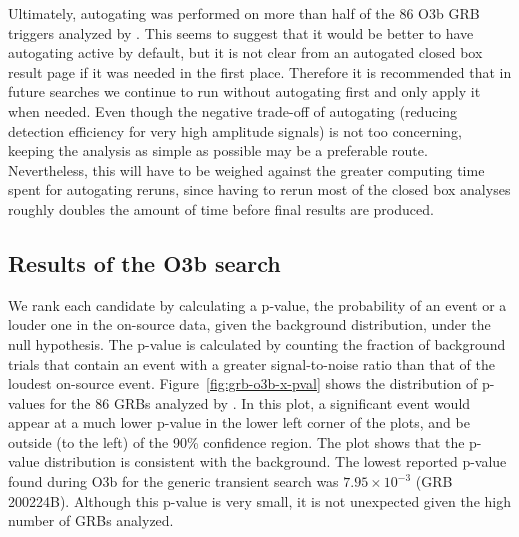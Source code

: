 

Ultimately, autogating was performed on more than half of the 86 O3b GRB triggers analyzed by \xpip.
This seems to suggest that it would be better to have autogating active by default, but it is not clear from an autogated closed box result page if it was needed in the first place.
Therefore it is recommended that in future searches we continue to run \xpip without autogating first and only apply it when needed.
Even though the negative trade-off of autogating (reducing detection efficiency for very high amplitude signals) is not too concerning, keeping the analysis as simple as possible may be a preferable route.
Nevertheless, this will have to be weighed against the greater computing time spent for autogating reruns, since having to rerun most of the closed box analyses roughly doubles the amount of time before final results are produced.


\subsection{Results of the O3b search}\label{sec:grb-o3b-results}

We rank each candidate by calculating a p-value, the probability of an event or a louder one in the on-source data, given the background distribution, under the null hypothesis.
The p-value is calculated by counting the fraction of background trials that contain an event with a greater signal-to-noise ratio than that of the loudest on-source event.
Figure~\ref{fig:grb-o3b-x-pval} shows the distribution of p-values for the 86 \acp{GRB} analyzed by \xpip.
In this plot, a significant event would appear at a much lower p-value in the lower left corner of the plots, and be outside (to the left) of the 90\% confidence region.
The plot shows that the p-value distribution is consistent with the background.
The lowest reported p-value found during O3b for the generic transient search was $7.95\times 10^{-3}$ (GRB 200224B). Although this p-value is very small, it is not unexpected given the high number of GRBs analyzed.

